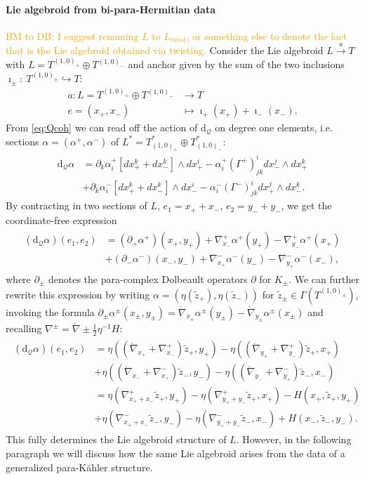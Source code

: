 \documentclass{article}
\newcommand{\QQ}{\mathcal{Q}}
\newcommand{\lc}{\mathring{\n}}
\newcommand{\ap}{\alpha}
\def\w{\wedge}
\newcommand{\p}{\partial}
\newcommand{\n}{\nabla}
\newcommand{\rd}{\mathrm{d}}
\newcommand{\se}{\Gamma}
\newcommand{\zt}{\tl{z}}
\def\tl{\tilde}
\theoremstyle{definition}
\theoremstyle{remark}
\def\btd{\textcolor{orange}{BM to DB: }\textcolor{orange}}
\begin{document}
\paragraph{Lie algebroid from bi-para-Hermitian data} 
\btd{I suggest renaming $L$ to $L_{twist}$, or something else to denote the fact that is the Lie algebroid obtained via twisting.}
Consider the Lie algebroid $L\overset{a}{\rightarrow} T$ with $L=T^{(1,0)_+}\oplus T^{(1,0)_-}$ and anchor given by the sum of the two inclusions $\imath_\pm:\ T^{(1,0)_\pm}\hookrightarrow T$:
\begin{align*}
a:L=T^{(1,0)_+}\oplus T^{(1,0)_-} &\rightarrow T\\
 e=(x_+,x_-) &\mapsto \imath_+(x_+)+\imath_-(x_-).
\end{align*}
From \eqref{eq:Qcoh} we can read off the action of $\rd_\QQ$ on degree one elements, i.e. sections $\alpha=(\alpha^+,\alpha^-)$ of $L^*=T^*_{(1,0)_+}\oplus T^*_{(1,0)_-}$:
\begin{align*}
\rd_\QQ\alpha&=\p_k\ap_i^+[dx_+^k+dx_-^k]\w dx_+^i-\ap^+_i(\Gamma^+)^i_{jk}dx_-^j\w dx_+^k\\
&+\p_k\ap_i^-[dx_+^k+dx_-^k]\w dx_-^i-\ap^-_i(\Gamma^-)^i_{jk}dx_+^j\w dx_-^k.
\end{align*}
By contracting in two sections of $L$, $e_1=x_++x_-$, $e_2=y_-+y_-$, we get the coordinate-free expression
\begin{align}\label{eq:dQ}
\begin{aligned}
(\rd_\QQ\ap)(e_1,e_2)&=(\p_+\ap^+)(x_+,y_+)+\n^+_{x_-}\ap^+(y_+)-\n^+_{y_-}\ap^+(x_+)\\
&+(\p_-\ap^-)(x_-,y_-)+\n^-_{x_+}\ap^-(y_-)-\n^-_{y_+}\ap^-(x_-),
\end{aligned}
\end{align}
where $\p_\pm$ denotes the para-complex Dolbeault operators $\p$ for $K_\pm$. We can further rewrite this expression by writing $\ap=(\eta(\tl{z}_+),\eta(\tl{z}_-))$ for $\tl{z}_\pm \in \se(T^{(1,0)_\pm})$, invoking the formula $\p_\pm\ap^\pm(x_\pm,y_\pm)=\lc_{x_\pm}\ap^\pm(y_\pm)-\lc_{y_\pm}\ap^\pm(x_\pm)$ and recalling $\n^\pm=\lc\pm \frac{1}{2}\eta^{-1}H$:
\begin{align}
\begin{aligned}
(\rd_\QQ\ap)(e_1,e_2)&=\eta((\lc_{x_+}+\n_{x_-}^+)\zt_+,y_+)-\eta((\lc_{y_+}+\n_{y_-}^+)\zt_+,x_+)\\
&+\eta((\lc_{x_-}+\n_{x_+}^-)\zt_-,y_-)-\eta((\lc_{y_-}+\n_{y_+}^-)\zt_-,x_-)\\
&=\eta(\n^+_{x_++x_-}\zt_+,y_+)-\eta(\n_{y_++y_-}^+\zt_+,x_+)-H(x_+,\zt_+,y_+)\\
&+\eta(\n_{x_++x_-}^-\zt_-,y_-)-\eta(\n_{y_++y_-}^-\zt_-,x_-)+H(x_-,\zt_-,y_-).
\end{aligned}
\end{align}
This fully determines the Lie algebroid structure of $L$. However, in the following paragraph we will discuss how the same Lie algebroid arises from the data of a generalized para-K\"ahler structure.
\end{document}
